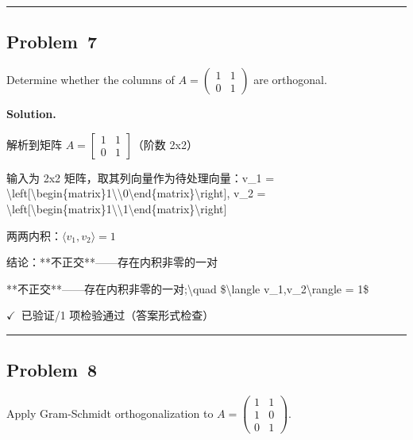\documentclass[12pt, a4paper]{article}
\newcommand{\problem}[1]{\subsection*{Problem~#1}}
\newcommand{\solution}{%
  \par\noindent
  {\color{solutiongreen}\bfseries Solution.}\par
}
\newcommand{\verifyok}{\textcolor{solutiongreen}{\ensuremath{\checkmark}\ 已验证}}
\begin{document}
\vspace{0.8em}\hrule\vspace{0.8em}

\problem{7}

\begin{stepbox}
Determine whether the columns of
$A = \begin{pmatrix} 1 & 1 \\ 0 & 1 \end{pmatrix}$ are orthogonal.
\end{stepbox}

\solution

\begin{stepbox}
解析到矩阵 $A = \left[\begin{matrix}1 & 1\\0 & 1\end{matrix}\right]$（阶数 2x2）
\end{stepbox}

\begin{stepbox}
输入为 2x2 矩阵，取其列向量作为待处理向量：v\_1 = \textbackslash{}left[\textbackslash{}begin\{matrix\}1\textbackslash{}\textbackslash{}0\textbackslash{}end\{matrix\}\textbackslash{}right], v\_2 = \textbackslash{}left[\textbackslash{}begin\{matrix\}1\textbackslash{}\textbackslash{}1\textbackslash{}end\{matrix\}\textbackslash{}right]
\end{stepbox}

\begin{stepbox}
两两内积：$\langle v_1,v_2\rangle = 1$
\end{stepbox}

\begin{stepbox}
结论：**不正交**——存在内积非零的一对
\end{stepbox}

\begin{center}
**不正交**——存在内积非零的一对;\textbackslash{}quad \$\textbackslash{}langle v\_1,v\_2\textbackslash{}rangle = 1\$
\end{center}

\begin{verifybox}\small \verifyok{}/1 项检验通过（答案形式检查） \end{verifybox}

\vspace{0.8em}\hrule\vspace{0.8em}

\problem{8}

\begin{stepbox}
Apply Gram-Schmidt orthogonalization to
$A = \begin{pmatrix} 1 & 1 \\ 1 & 0 \\ 0 & 1 \end{pmatrix}$.
\end{stepbox}
\end{document}

